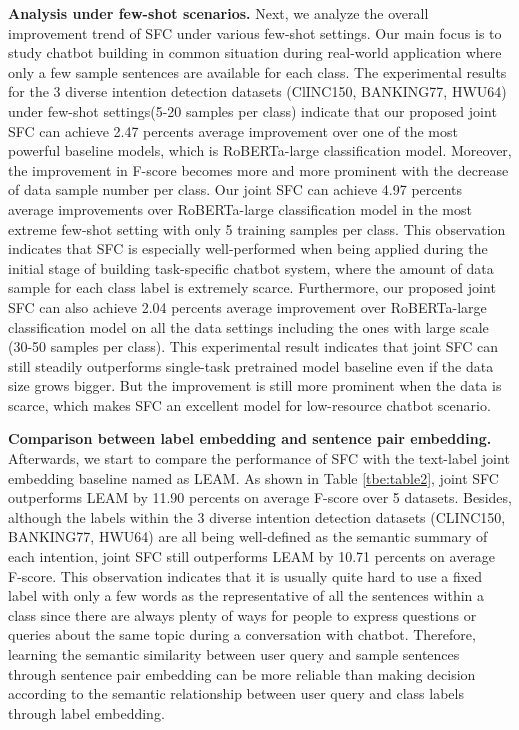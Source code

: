 \documentclass[letterpaper]{article} %
\begin{document}
  \textbf{Analysis  under  few-shot  scenarios.}  Next,  we  analyze the overall
  improvement trend of SFC under various few-shot settings. Our main focus is to
  study chatbot building in common situation during real-world application where
  only  a  few  sample  sentences are available for each class. The experimental
  results  for  the  3  diverse  intention detection datasets (ClINC150, BANKING77,
  HWU64) under few-shot settings(5-20 samples per class) indicate that our proposed joint SFC can
  achieve  2.47  percents  average  improvement  over  one  of the most powerful
  baseline  models,  which  is  RoBERTa-large classification model. Moreover, the improvement in F-score becomes more and more
  prominent  with the decrease of data sample number per class. Our joint
  SFC   can  achieve  4.97  percents  average  improvements  over  RoBERTa-large
  classification model in the most extreme few-shot setting with only 5 training
  samples  per class. This observation indicates that SFC is especially well-performed
  when  being  applied during the initial stage of building task-specific chatbot
  system,  where  the  amount  of  data sample for each class label is extremely scarce. Furthermore, our proposed joint SFC can also achieve 2.04 percents average improvement over RoBERTa-large classification model on all the data settings including the ones with large scale (30-50 samples per class). This experimental result indicates that joint SFC can still steadily outperforms single-task pretrained model baseline even if the data size grows bigger. But the improvement is still more prominent when the data is scarce, which makes SFC an excellent model for low-resource chatbot scenario.

  \textbf{Comparison  between  label  embedding  and  sentence  pair embedding.}
  Afterwards,  we  start  to  compare the performance of SFC with the text-label
  joint  embedding  baseline  named as LEAM. As shown in Table \ref{tbe:table2},
  joint  SFC outperforms LEAM by 11.90 percents on average F-score over 5
  datasets.  Besides,  although the labels within the 3 diverse intention detection
  datasets  (CLINC150,  BANKING77,  HWU64)  are  all  being  well-defined as the
  semantic  summary  of  each intention, joint SFC still outperforms LEAM by
  10.71  percents  on  average  F-score.  This  observation  indicates that it is
  usually  quite  hard  to  use  a  fixed  label  with  only  a few words as the
  representative  of  all  the  sentences  within a class since there are always
  plenty of ways for people to express questions or queries about the same topic
  during   a   conversation  with  chatbot.  Therefore,  learning  the  semantic
  similarity  between  user  query  and  sample  sentences through sentence pair
  embedding  can be more reliable than making decision according to the semantic
  relationship between user query and class labels through label embedding.
\end{document}
